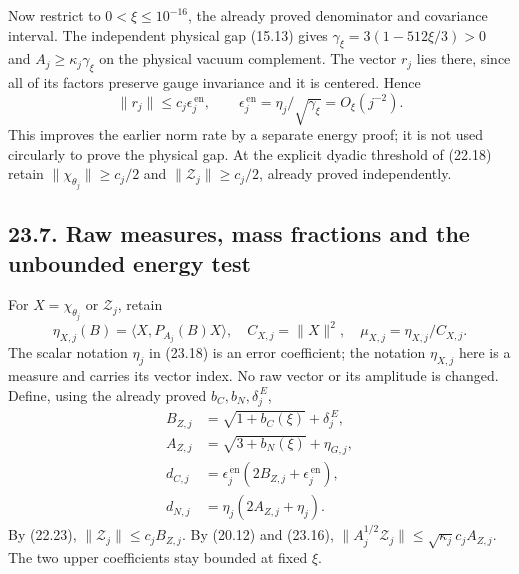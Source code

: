 \documentclass[
]{article}
\begin{document}
Now restrict to \(0<\xi\le10^{-16}\), the already proved denominator and
covariance interval. The independent physical gap (15.13) gives
\(\gamma_\xi=3(1-512\xi/3)>0\) and \(A_j\ge\kappa_j\gamma_\xi\) on the
physical vacuum complement. The vector \(r_j\) lies there, since all of
its factors preserve gauge invariance and it is centered. Hence \[
\|r_j\|\le c_j\epsilon_j^{\,\mathrm{en}},\qquad
\epsilon_j^{\,\mathrm{en}}=\eta_j/\sqrt{\gamma_\xi}
                         =O_\xi(j^{-2}).
\tag{23.20}
\] This improves the earlier norm rate by a separate energy proof; it is
not used circularly to prove the physical gap. At the explicit dyadic
threshold of (22.18) retain \(\|\chi_{\theta_j}\|\ge c_j/2\) and
\(\|\mathcal Z_j\|\ge c_j/2\), already proved independently.

\subsection{23.7. Raw measures, mass fractions and the unbounded energy
test}\label{raw-measures-mass-fractions-and-the-unbounded-energy-test}

For \(X=\chi_{\theta_j}\) or \(\mathcal Z_j\), retain \[
\eta_{X,j}(B)=\langle X,P_{A_j}(B)X\rangle,\quad
C_{X,j}=\|X\|^2,\quad \mu_{X,j}=\eta_{X,j}/C_{X,j}.
\] The scalar notation \(\eta_j\) in (23.18) is an error coefficient;
the notation \(\eta_{X,j}\) here is a measure and carries its vector
index. No raw vector or its amplitude is changed. Define, using the
already proved \(b_C,b_N,\delta_j^{\,E}\), \[
\begin{aligned}
B_{Z,j}&=\sqrt{1+b_C(\xi)}+\delta_j^{\,E},\\
A_{Z,j}&=\sqrt{3+b_N(\xi)}+\eta_{G,j},\\
d_{C,j}&=\epsilon_j^{\,\mathrm{en}}
                      (2B_{Z,j}+\epsilon_j^{\,\mathrm{en}}),\\
d_{N,j}&=\eta_j(2A_{Z,j}+\eta_j).
\end{aligned}\tag{23.21}
\] By (22.23), \(\|\mathcal Z_j\|\le c_jB_{Z,j}\). By (20.12) and
(23.16), \(\|A_j^{1/2}\mathcal Z_j\|\le
\sqrt{\kappa_j}c_jA_{Z,j}\). The two upper coefficients stay bounded at
fixed \(\xi\).
\end{document}
